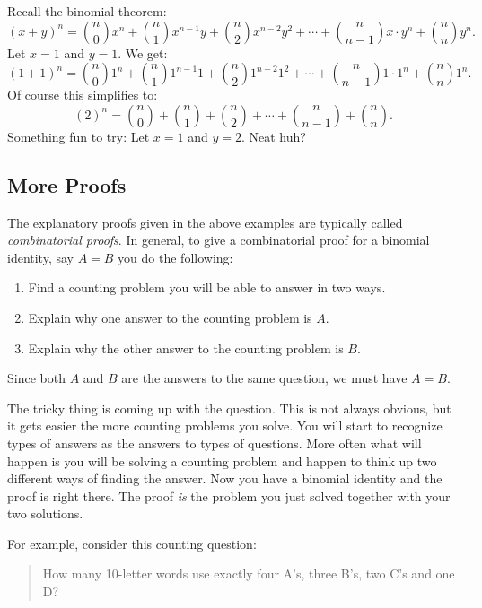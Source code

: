 \documentclass[12pt]{article}
\begin{document}
Recall the binomial theorem:
\[(x + y)^n = {n \choose 0}x^n + {n \choose 1}x^{n-1}y + {n \choose 2}x^{n-2}y^2 + \cdots + {n \choose n-1}x\cdot y^n + {n \choose n}y^n.\]
Let $x = 1$ and $y = 1$.  We get:
\[(1 + 1)^n = {n \choose 0}1^n + {n \choose 1}1^{n-1}1 + {n \choose 2}1^{n-2}1^2 + \cdots + {n \choose n-1}1\cdot 1^n + {n \choose n}1^n.\]
Of course this simplifies to:
\[(2)^n = {n \choose 0} + {n \choose 1} + {n \choose 2} + \cdots + {n \choose n-1} + {n \choose n}.\]
Something fun to try: Let $x = 1$ and $y = 2$.  Neat huh?

\subsection{More Proofs}

The explanatory proofs given in the above examples are typically called {\em combinatorial proofs}.  In general, to give a combinatorial proof for a binomial identity, say $A = B$ you do the following:
\begin{enumerate}
  \item Find a counting problem you will be able to answer in two ways.
  \item Explain why one answer to the counting problem is $A$.
  \item Explain why the other answer to the counting problem is $B$.
\end{enumerate}

Since both $A$ and $B$ are the answers to the same question, we must have $A = B$.  

The tricky thing is coming up with the question.  This is not always obvious, but it gets easier the more counting problems you solve.  You will start to recognize types of answers as the answers to types of questions.  More often what will happen is you will be solving a counting problem and happen to think up two different ways of finding the answer.  Now you have a binomial identity and the proof is right there.  The proof \emph{is} the problem you just solved together with your two solutions.

For example, consider this counting question:

\begin{quote}
  How many 10-letter words use exactly four A's, three B's, two C's and one D?
\end{quote}
\end{document}
